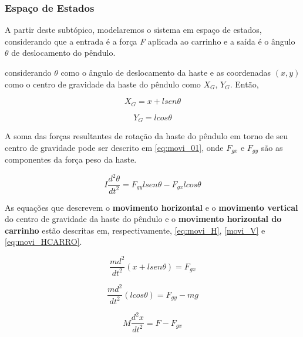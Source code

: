 \documentclass[a4paper, 12pt]{article}
\begin{document}
\subsubsection{Espaço de Estados}
A partir deste subtópico, modelaremos o sistema em espaço de estados, considerando que a entrada é a força \textit{F} aplicada ao carrinho e a saída é o ângulo $\theta$ de deslocamento do pêndulo.

considerando $\theta$ como o ângulo de deslocamento da haste e as coordenadas $(x, y)$ como o centro de gravidade da haste do pêndulo como $X_{G}$, $Y_{G}$. Então,

\begin{equation}\label{eq:cd}
    X_{G} = x + lsen\theta
\end{equation}


\begin{equation}\label{eq:cd}
    Y_{G} = lcos\theta
\end{equation}

A soma das forças resultantes de rotação da haste do pêndulo em torno de seu centro de gravidade pode ser
descrito em \ref{eq:movi_01}, onde $F_{gx}$ e $F_{gy}$ são as componentes da força peso da haste.

\begin{equation}\label{eq:movi_01}
    I\frac{d^2\theta}{dt^2} = F_{gy}lsen\theta - F_{gx}lcos\theta
\end{equation}

As equações que descrevem o \textbf{movimento horizontal} e o \textbf{movimento vertical} do centro de gravidade da haste do pêndulo e o \textbf{movimento horizontal do carrinho} estão descritas em, respectivamente, \ref{eq:movi_H}, \ref{movi_V} e \ref{eq:movi_HCARRO}.

\begin{equation}\label{eq:movi_H}
    \frac{md^2}{dt^2}(x + l sen\theta) = F_{gx}
\end{equation}



\begin{equation}\label{movi_V}
    \frac{md^2}{dt^2}(lcos\theta) = F_{gy} - mg
\end{equation}



\begin{equation}\label{eq:movi_HCARRO}
    M\frac{d^2x}{dt^2} = F - F_{gx}
\end{equation}

\end{document}
